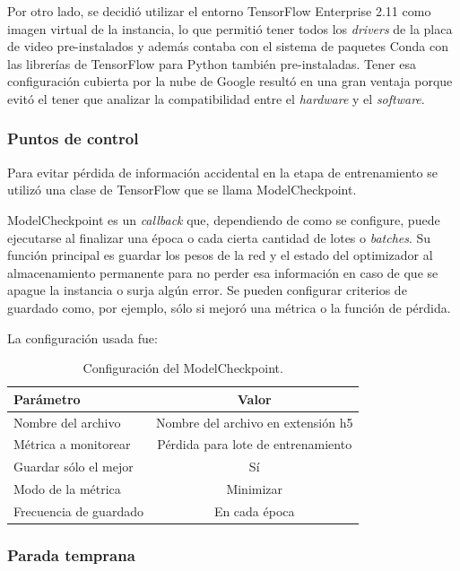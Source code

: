 Por otro lado, se decidió utilizar el entorno TensorFlow Enterprise 2.11 como imagen virtual de la instancia, lo que permitió tener todos los \textit{drivers} de la placa de video pre-instalados y además contaba con el sistema de paquetes Conda con las librerías de TensorFlow para Python también pre-instaladas. Tener esa configuración cubierta por la nube de Google resultó en una gran ventaja porque evitó el tener que analizar la compatibilidad entre el \textit{hardware} y el \textit{software}.

\subsubsection{Puntos de control}

Para evitar pérdida de información accidental en la etapa de entrenamiento se utilizó una clase de TensorFlow que se llama ModelCheckpoint.

ModelCheckpoint es un \textit{callback} que, dependiendo de como se configure, puede ejecutarse al finalizar una época o cada cierta cantidad de lotes o \textit{batches}. Su función principal es guardar los pesos de la red y el estado del optimizador al almacenamiento permanente para no perder esa información en caso de que se apague la instancia o surja algún error. Se pueden configurar criterios de guardado como, por ejemplo, sólo si mejoró una métrica o la función de pérdida.

La configuración usada fue:
\begin{table}[ht]
	\centering
	\caption[Configuración ModelCheckpoint]{Configuración del ModelCheckpoint.}
	\begin{tabular}{l c}    
		\toprule
		\textbf{Parámetro}			& 			\textbf{Valor}  \\
		\midrule	
		Nombre del archivo			& 			Nombre del archivo en extensión h5  \\
		Métrica a monitorear 		& 			Pérdida para lote de entrenamiento  \\
		Guardar sólo el mejor		&			Sí \\
		Modo de la métrica 			& 			Minimizar \\
		Frecuencia de guardado 		& 			En cada época  \\
		\bottomrule
		\hline
	\end{tabular}
	\label{tab:checkpoint}
\end{table}

\subsubsection{Parada temprana}

